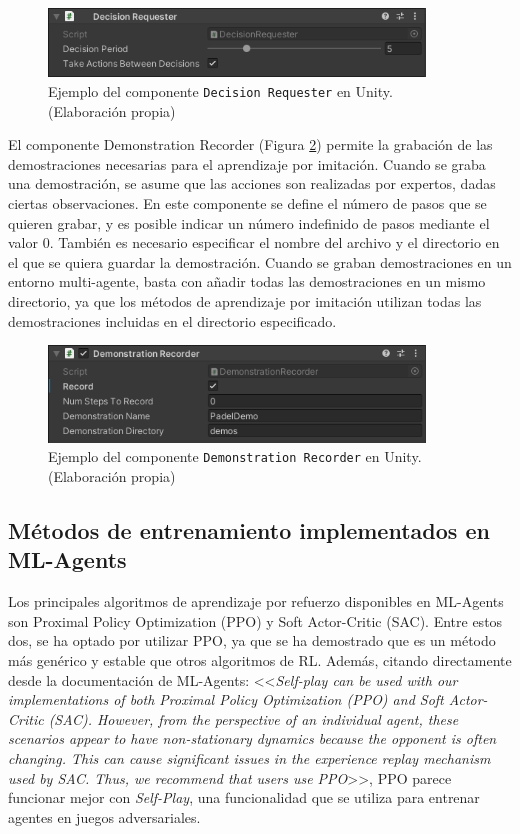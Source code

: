 \begin{figure}[H]
    \centering
    \includegraphics[width=10cm]{figures/decision-req.png}
    \caption{Ejemplo del componente \texttt{Decision Requester} en Unity. (Elaboración propia)}
    \label{fig:decision-req}
\end{figure}

El componente {Demonstration Recorder} (Figura \ref{fig:demo-recorder}) permite la grabación de las demostraciones necesarias para el aprendizaje por imitación. Cuando se graba una demostración, se asume que las acciones son realizadas por expertos, dadas ciertas observaciones. En este componente se define el número de pasos que se quieren grabar, y es posible indicar un número indefinido de pasos mediante el valor 0. También es necesario especificar el nombre del archivo y el directorio en el que se quiera guardar la demostración. Cuando se graban demostraciones en un entorno multi-agente, basta con añadir todas las demostraciones en un mismo directorio, ya que los métodos de aprendizaje por imitación utilizan todas las demostraciones incluidas en el directorio especificado.

\begin{figure}[H]
    \centering
    \includegraphics[width=10cm]{figures/demonstration-recorder.png}
    \caption{Ejemplo del componente \texttt{Demonstration Recorder} en Unity. (Elaboración propia)}
    \label{fig:demo-recorder}
\end{figure}

\subsection{Métodos de entrenamiento implementados en ML-Agents}

Los principales algoritmos de aprendizaje por refuerzo disponibles en ML-Agents son Proximal Policy Optimization (PPO) y Soft Actor-Critic (SAC). Entre estos dos, se ha optado por utilizar PPO, ya que se ha demostrado que es un método más genérico y estable que otros algoritmos de RL. Además, citando directamente desde la documentación de ML-Agents: <<\emph{Self-play can be used with our implementations of both Proximal Policy Optimization (PPO) and Soft Actor-Critic (SAC). However, from the perspective of an individual agent, these scenarios appear to have non-stationary dynamics because the opponent is often changing. This can cause significant issues in the experience replay mechanism used by SAC. Thus, we recommend that users use PPO}>>, PPO parece funcionar mejor con \emph{Self-Play}, una funcionalidad que se utiliza para entrenar agentes en juegos adversariales.

